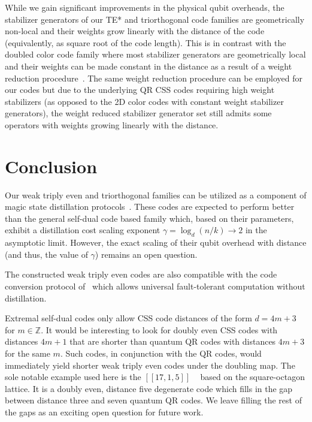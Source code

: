 \documentclass[journal]{IEEEtran}
\begin{document}
While we gain significant improvements in the physical qubit overheads, the stabilizer generators of our TE* and triorthogonal code families are geometrically non-local and their weights grow linearly with the distance of the code (equivalently, as square root of the code length). This is in contrast with the doubled color code family where most stabilizer generators are geometrically local and their weights can be made constant in the distance as a result of a weight reduction procedure~\cite{bravyi_doubled_2015}. The same weight reduction procedure can be employed for our codes but due to the underlying QR CSS codes requiring high weight stabilizers (as opposed to the 2D color codes with constant weight stabilizer generators), the weight reduced stabilizer generator set still admits some operators with weights growing linearly with the distance.


\section{Conclusion}\label{sec:conclusion}
    
Our weak triply even and triorthogonal families can be utilized as a component of magic state distillation protocols~\cite{bravyi_universal_2005,reichardt_quantum_2005,reichardt_error-detection-based_2009,reichardt_quantum_2009,campbell_roads_2017}. These codes are expected to perform better than the general self-dual code based family which, based on their parameters, exhibit a distillation cost scaling exponent $\gamma=\log_d(n/k)\rightarrow 2$ in the asymptotic limit. However, the exact scaling of their qubit overhead with distance (and thus, the value of $\gamma$) remains an open question. 

The constructed weak triply even codes are also compatible with the code conversion protocol of~\cite{sullivan_code_2024} which allows universal fault-tolerant computation without distillation. 

Extremal self-dual codes only allow CSS code distances of the form $d=4m+3$ for $m\in\mathbb{Z}$. It would be interesting to look for doubly even CSS codes with distances $4m+1$ that are shorter than quantum QR codes with distances $4m+3$ for the same $m$. Such codes, in conjunction with the QR codes, would immediately yield shorter weak triply even codes under the doubling map. 
The sole notable example used here is the $[[17,1,5]]$ ~\cite{bombin_topological_2006} based on the square-octagon lattice. It is a doubly even, distance five degenerate code which fills in the gap between distance three and seven quantum QR codes.
We leave filling the rest of the gaps as an exciting open question for future work.
\end{document}
